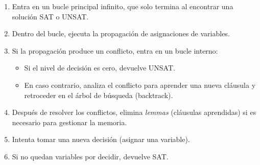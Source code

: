 \begin{enumerate}
    \item Entra en un bucle principal infinito, que solo termina al encontrar una solución SAT o UNSAT.
    \item Dentro del bucle, ejecuta la propagación de asignaciones de variables.
    \item Si la propagación produce un conflicto, entra en un bucle interno:
    \begin{itemize}
        \item Si el nivel de decisión es cero, devuelve UNSAT.
        \item En caso contrario, analiza el conflicto para aprender una nueva cláusula y retroceder en el árbol de búsqueda (backtrack).
    \end{itemize}
    \item Después de resolver los conflictos, elimina \textit{lemmas} (cláusulas aprendidas) si es necesario para gestionar la memoria.
    \item Intenta tomar una nueva decisión (asignar una variable).
    \item Si no quedan variables por decidir, devuelve SAT.
\end{enumerate}


